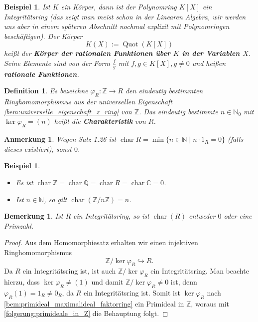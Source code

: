 \documentclass[a4paper, twoside, 11pt, ngerman]{report}
\newcommand{\CC}{\mathds C}
\newcommand{\NN}{\mathds N}
\newcommand{\QQ}{\mathds Q}
\newcommand{\ZZ}{\mathds Z}
\DeclareMathOperator{\charact}{char}
\DeclareMathOperator{\Quot}{Quot}
\theoremstyle{definistyle}
\newtheorem{defini}[satz]{Definition}
\newtheorem{bem}[satz]{Bemerkung}
\newtheorem{anm}[satz]{Anmerkung}
\newtheorem{bsp}[satz]{Beispiel}
\theoremstyle{remark}
\newcommand{\defn}[1]{\textit{\bfseries #1}}
\begin{document}
\begin{bsp}\label{bsp:funktionenkoerper}
Ist $K$ ein Körper, dann ist der Polynomring $K[X]$ ein Integritätsring (das zeigt man meist
schon in der Linearen Algebra, wir werden uns aber in einem späteren Abschnitt nochmal explizit
mit Polynomringen beschäftigen). Der Körper
\[
K(X):=\Quot(K[X])
\]
heißt der \defn{Körper der rationalen Funktionen über $K$ in der Variablen $X$}. Seine Elemente
sind von der Form $\frac{f}{g}$ mit $f,g\in K[X],g\neq 0$ und heißen \defn{rationale Funktionen}.
\end{bsp}

\begin{defini}\label{def:charakteristik}
Es bezeichne $\varphi_R\colon\ZZ\to R$ den eindeutig bestimmten Ringhomomorphismus aus der universellen Eigenschaft \ref{bem:universelle_eigenschaft_z_ring} von $\ZZ$.
Das eindeutig bestimmte $n \in \NN_0$ mit $\ker \varphi_R = (n)$ heißt die \defn{Charakteristik} von $R$.
\end{defini}

\begin{anm}\label{anm:charakteristik}
Wegen Satz 1.26 ist $\charact R = \min \{ n \in \NN \mid n \cdot 1_R = 0 \}$ (falls dieses existiert), sonst $0$.
\end{anm}

\begin{bsp}\label{bsp:charakteristik_beispiele}
\begin{itemize}
    \item[(a)] Es ist $\charact \ZZ = \charact \QQ = \charact R = \charact \CC = 0$.
    \item[(b)] Ist $n\in\NN$, so gilt $\charact (\ZZ / n\ZZ) = n$.
\end{itemize}
\end{bsp}

\begin{bem}\label{bem:charakteristik_primzahl}
Ist $R$ ein Integritätsring, so ist $\charact(R)$ entweder $0$ oder eine Primzahl.
\end{bem}

\begin{proof}
Aus dem Homomorphiesatz erhalten wir einen injektiven Ringhomomorphismus
\[
\ZZ / \ker \varphi_R \hookrightarrow R.
\]
Da $R$ ein Integritätsring ist, ist auch $\ZZ / \ker \varphi_R$ ein Integritätsring. Man beachte hierzu, dass $\ker \varphi_R \neq (1)$ und damit $\ZZ / \ker \varphi_R \neq 0$ ist, denn $\varphi_R(1) = 1_R \neq 0_R$, da $R$ ein Integritätsring ist. Somit ist $\ker \varphi_R$ nach \ref{bem:primideal_maximalideal_faktorring} ein Primideal in $\ZZ$, woraus mit \ref{folgerung:primideale_in_Z} die Behauptung folgt.
\end{proof}
\end{document}
